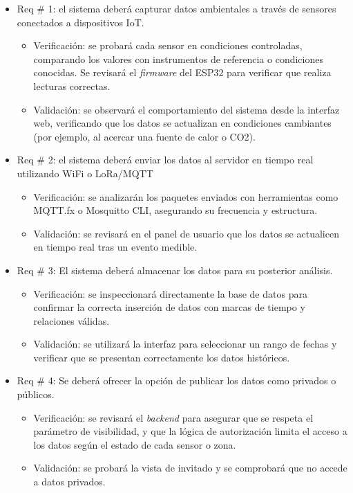 \documentclass[
11pt, %
]{charter}
\begin{document}
\begin{itemize}
	\item Req \# 1: el sistema deberá capturar datos ambientales a través de sensores conectados a dispositivos IoT.

    \begin{itemize}
	    \item Verificación: se probará cada sensor en condiciones controladas, comparando los valores con instrumentos de referencia o condiciones conocidas. Se revisará el \textit{firmware} del ESP32 para verificar que realiza lecturas correctas.
	    \item Validación: se observará el comportamiento del sistema desde la interfaz web, verificando que los datos se actualizan en condiciones cambiantes (por ejemplo, al acercar una fuente de calor o CO2).
    \end{itemize}

	\item Req \# 2: el sistema deberá enviar los datos al servidor en tiempo real utilizando WiFi o LoRa/MQTT
	\begin{itemize}
		\item Verificación: se analizarán los paquetes enviados con herramientas como MQTT.fx o Mosquitto CLI, asegurando su frecuencia y estructura.
		\item Validación: se revisará en el panel de usuario que los datos se actualicen en tiempo real tras un evento medible.
	\end{itemize}
	
	\item Req \# 3: El sistema deberá almacenar los datos para su posterior análisis.
	\begin{itemize}
		\item Verificación: se inspeccionará directamente la base de datos para confirmar la correcta inserción de datos con marcas de tiempo y relaciones válidas.

		\item Validación: se utilizará la interfaz para seleccionar un rango de fechas y verificar que se presentan correctamente los datos históricos.
	\end{itemize}

	\item Req \# 4: Se deberá ofrecer la opción de publicar los datos como privados o públicos.
	\begin{itemize}
		\item Verificación: se revisará el \textit{backend} para asegurar que se respeta el parámetro de visibilidad, y que la lógica de autorización limita el acceso a los datos según el estado de cada sensor o zona.
		\item Validación: se probará la vista de invitado y se comprobará que no accede a datos privados.
	\end{itemize}
	

\end{itemize}
\end{document}
